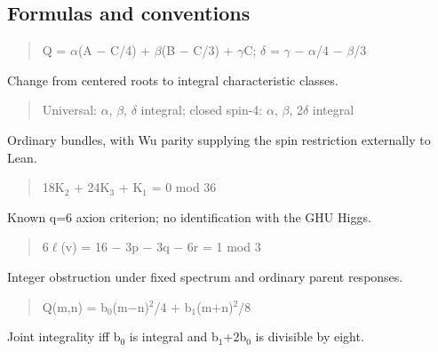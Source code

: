 \documentclass[11pt,a4paper]{article}
\begin{document}
\subsection*{Formulas and conventions}
\noindent\begin{minipage}{\linewidth}
\begin{quote}Q = \ensuremath{\alpha}(A \ensuremath{-} C/4) + \ensuremath{\beta}(B \ensuremath{-} C/3) + \ensuremath{\gamma}C; \ensuremath{\delta} = \ensuremath{\gamma} \ensuremath{-} \ensuremath{\alpha}/4 \ensuremath{-} \ensuremath{\beta}/3\end{quote}
Change from centered roots to integral characteristic classes.

\end{minipage}\par\medskip
\noindent\begin{minipage}{\linewidth}
\begin{quote}Universal: \ensuremath{\alpha}, \ensuremath{\beta}, \ensuremath{\delta} integral; closed spin-4: \ensuremath{\alpha}, \ensuremath{\beta}, 2\ensuremath{\delta} integral\end{quote}
Ordinary bundles, with Wu parity supplying the spin restriction externally to Lean.

\end{minipage}\par\medskip
\noindent\begin{minipage}{\linewidth}
\begin{quote}18K\ensuremath{{}_{2}} + 24K\ensuremath{{}_{3}} + K\ensuremath{{}_{1}} = 0 mod 36\end{quote}
Known q=6 axion criterion; no identification with the GHU Higgs.

\end{minipage}\par\medskip
\noindent\begin{minipage}{\linewidth}
\begin{quote}6\ensuremath{\ell}(v) = 16 \ensuremath{-} 3p \ensuremath{-} 3q \ensuremath{-} 6r = 1 mod 3\end{quote}
Integer obstruction under fixed spectrum and ordinary parent responses.

\end{minipage}\par\medskip
\noindent\begin{minipage}{\linewidth}
\begin{quote}Q(m,n) = b\ensuremath{{}_{0}}(m\ensuremath{-}n)\ensuremath{{}^{2}}/4 + b\ensuremath{{}_{1}}(m+n)\ensuremath{{}^{2}}/8\end{quote}
Joint integrality iff b\ensuremath{{}_{0}} is integral and b\ensuremath{{}_{1}}+2b\ensuremath{{}_{0}} is divisible by eight.

\end{minipage}\par\medskip
\end{document}
